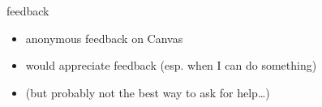\begin{frame}{feedback}
    \begin{itemize}
    \item anonymous feedback on Canvas
    \vspace{.5cm}
    \item would appreciate feedback (esp. when I can do something)
    \item (but probably not the best way to ask for help\ldots)
    \end{itemize}
\end{frame}
